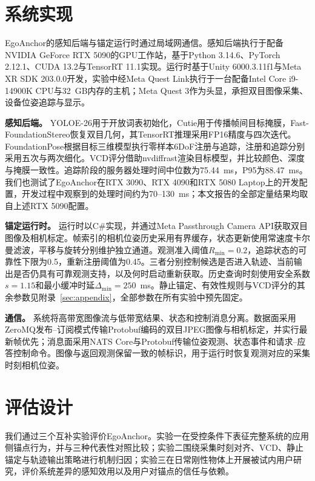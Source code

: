 \documentclass[review]{vgtc}
\begin{document}
\section{系统实现}\label{sec:implementation}

EgoAnchor的感知后端与锚定运行时通过局域网通信。感知后端执行于配备NVIDIA GeForce RTX 5090的GPU工作站，基于Python 3.14.6、PyTorch 2.12.1、CUDA 13.2与TensorRT 11.1实现。运行时基于Unity 6000.3.11f1与Meta XR SDK 203.0.0开发，实验中经Meta Quest Link执行于一台配备Intel Core i9-14900K CPU与32~GB内存的主机；Meta Quest 3作为头显，承担双目图像采集、设备位姿追踪与显示。

\textbf{感知后端。}
YOLOE-26用于开放词表初始化，Cutie用于传播帧间目标掩膜，Fast-FoundationStereo恢复双目几何，其TensorRT推理采用FP16精度与四次迭代。FoundationPose根据目标三维模型执行零样本6DoF注册与追踪，注册和追踪分别采用五次与两次细化。VCD评分借助nvdiffrast渲染目标模型，并比较颜色、深度与掩膜一致性。追踪阶段的服务器处理时间中位数为75.44~ms，P95为88.47~ms。我们也测试了EgoAnchor在RTX 3090、RTX 4090和RTX 5080 Laptop上的开发配置，开发过程中观察到的处理时间约为70--130~ms；本文报告的全部定量结果均取自上述RTX 5090配置。

\textbf{锚定运行时。}
运行时以C\#实现，并通过Meta Passthrough Camera API获取双目图像及相机标定。帧索引的相机位姿历史采用有界缓存，状态更新使用常速度卡尔曼滤波，平移与旋转分别维护独立通道。观测准入阈值$R_{\min}=0.2$，追踪状态的可靠性下限为0.5，重新注册阈值为0.45。三者分别控制候选是否进入轨迹、当前输出是否仍具有可靠观测支持，以及何时启动重新获取。历史查询时刻使用安全系数$s=1.15$和最小缓冲时延$\Delta_{\min}=250$~ms。静止锚定、有效性规则与VCD评分的其余参数见附录~\ref{sec:appendix}，全部参数在所有实验中预先固定。

\textbf{通信。}
系统将高带宽图像流与低带宽结果、状态和控制消息分离。数据面采用ZeroMQ发布--订阅模式传输Protobuf编码的双目JPEG图像与相机标定，并实行最新帧优先；消息面采用NATS Core与Protobuf传输位姿观测、状态事件和请求--应答控制命令。图像与返回观测保留一致的帧标识，用于运行时恢复观测对应的采集时刻相机位姿。

\section{评估设计}\label{sec:evaluation}

我们通过三个互补实验评价EgoAnchor。实验一在受控条件下表征完整系统的应用侧锚点行为，并与三种代表性对照比较；实验二围绕采集时刻对齐、VCD、静止锚定与轨迹输出策略进行机制归因；实验三在日常刚性物体上开展被试内用户研究，评价系统差异的感知效用以及用户对锚点的信任与依赖。
\end{document}
